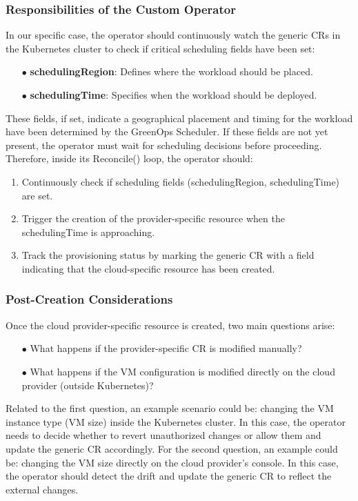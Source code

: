 \subsubsection{Responsibilities of the Custom Operator}

In our specific case, the operator should continuously watch the generic CRs in the Kubernetes cluster to check if critical scheduling fields have been set:
\begin{itemize}[itemsep=0.2pt, topsep=1pt]
  \item[$\bullet$] \textbf{schedulingRegion}: Defines where the workload should be placed.
  \item[$\bullet$] \textbf{schedulingTime}: Specifies when the workload should be deployed.
\end{itemize}

These fields, if set, indicate a geographical placement and timing for the workload have been determined by the GreenOps Scheduler.
If these fields are not yet present, the operator must wait for scheduling decisions before proceeding.
Therefore, inside its Reconcile() loop, the operator should:
\begin{enumerate}[itemsep=0.2pt, topsep=1pt]
  \item Continuously check if scheduling fields (schedulingRegion, schedulingTime) are set.
  \item Trigger the creation of the provider-specific resource when the schedulingTime is approaching.
  \item Track the provisioning status by marking the generic CR with a field indicating that the cloud-specific resource has been created.
\end{enumerate}

\subsubsection{Post-Creation Considerations}

Once the cloud provider-specific resource is created, two main questions arise:
\begin{itemize}[itemsep=0.2pt, topsep=1pt]
  \item[$\bullet$] What happens if the provider-specific CR is modified manually?
  \item[$\bullet$] What happens if the VM configuration is modified directly on the cloud provider (outside Kubernetes)?
\end{itemize}

Related to the first question, an example scenario could be: changing the VM instance type (VM size) inside the Kubernetes cluster. In this case, the operator needs to decide whether to revert unauthorized changes or allow them and update the generic CR accordingly.
For the second question, an example could be: changing the VM size directly on the cloud provider’s console. In this case, the operator should detect the drift and update the generic CR to reflect the external changes.

